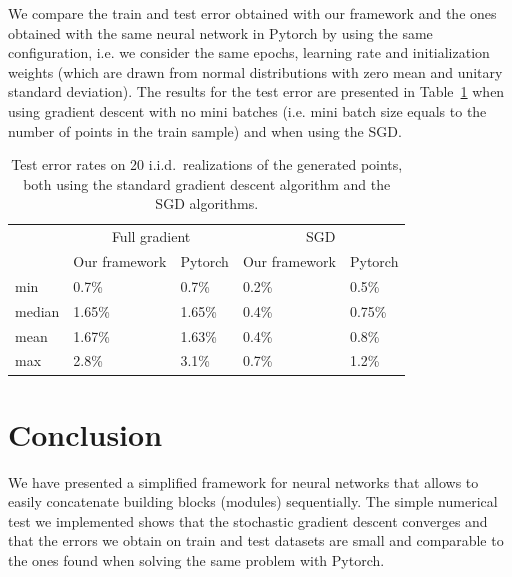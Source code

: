 \documentclass[10pt,final,a4paper]{article}
\begin{document}
We compare the train and test error obtained with our framework and the ones obtained with the same neural network in Pytorch by using the same configuration, i.e. we consider the same epochs, learning rate and initialization weights (which are drawn from normal distributions with zero mean and unitary standard deviation). The results for the test error are presented in Table~\ref{t1} when using gradient descent with no mini batches (i.e. mini batch size equals to the number of points in the train sample) and when using the SGD.

 \begin{table}
 \begin{center}
    \begin{tabular}{l l l l l}
\toprule
     $ $ & \multicolumn{2}{c}{Full gradient} & \multicolumn{2}{c}{SGD} \\
     \cmidrule(lr){2-3}
     \cmidrule(lr){4-5}
     $ $ & Our framework & Pytorch & Our framework & Pytorch \\
\midrule
    min      	& 0.7\% 		& 0.7\% 		& 0.2\% & 0.5\%\\
    median 	    & 1.65\% 	    & 1.65\% 		& 0.4\% & 0.75\% \\
    mean    	& 1.67\%		& 1.63\%		& 0.4\% & 0.8\% \\
    max      	& 2.8\% 		& 3.1\% 		& 0.7\% & 1.2\%  \\
\bottomrule
    \end{tabular}
    \end{center}
    \caption{Test error rates on 20 i.i.d.\ realizations of the generated points, both using the standard gradient descent algorithm and the SGD algorithms.}
    \label{t1}
    \end{table}
\section{Conclusion}
We have presented a simplified framework for neural networks that allows to easily concatenate building blocks (modules) sequentially. The simple numerical test we implemented shows that the stochastic gradient descent converges and that the errors we obtain on train and test datasets are small and comparable to the ones found when solving the same problem with Pytorch. 
\end{document}
